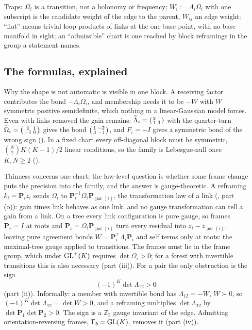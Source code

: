 Traps: \(\Omega_i\) is a transition, not a holonomy or frequency; \(W_i:=\Lambda_i\Omega_i\) with one
subscript is the candidate weight of the edge to the parent, \(W_{ij}\) an edge weight; ``flat'' means
trivial loop products of links at the one base point, with no base manifold in sight; an ``admissible''
chart is one reached by block reframings in the group a statement names.

\subsection{The formulas, explained}

Why the shape is not automatic is visible in one block. A receiving factor contributes the bond
\(-\Lambda_i\Omega_i\), and membership needs it to be \(-W\) with \(W\) symmetric positive
semidefinite, which nothing in a linear-Gaussian model forces. Even with links removed the gain remains:
\(\widetilde\Lambda_i=\begin{psmallmatrix}2&1\\1&3\end{psmallmatrix}\) with the quarter-turn
\(\widetilde\Omega_i=\begin{psmallmatrix}0&1\\-1&0\end{psmallmatrix}\) gives the bond
\(\begin{psmallmatrix}1&-2\\3&-1\end{psmallmatrix}\), and \(F_i=-I\) gives a symmetric bond of the wrong
sign (). In a fixed chart every off-diagonal block must be
symmetric, \(\binom N2K(K-1)/2\) linear conditions, so the family is Lebesgue-null once \(K,N\geq2\)
().

Thinness concerns one chart; the law-level question is whether some frame change puts the precision into
the family, and the answer is gauge-theoretic. A reframing \(k_i=\mathbf P_iz_i\) sends \(\Omega_i\) to
\(\mathbf P_i^{-1}\Omega_i\mathbf P_{\operatorname{par}(i)}\), the transformation law of a link
(, part (o)): gain times link behaves as one link, and no gauge
transformation can tell a gain from a link. On a tree every link configuration is pure gauge, so frames
\(\mathbf P_r=I\) at roots and \(\mathbf P_i=\Omega_i\mathbf P_{\operatorname{par}(i)}\) turn every
residual into \(z_i-z_{\operatorname{par}(i)}\), leaving pure agreement bonds
\(W=\mathbf P_i^\top\Lambda_i\mathbf P_i\) and self terms only at roots: the maximal-tree gauge applied to
transitions. The frames must lie in the frame group, which under \(\mathrm{GL}^+(K)\) requires
\(\det\Omega_i>0\); for a forest with invertible transitions this is also necessary (part (iii)). For a
pair the only obstruction is the sign
\[
(-1)^K\det\Lambda_{12}>0
\]
(part (ii)). Informally: a member with invertible bond has \(\Lambda_{12}=-W\), \(W\succ0\), so
\((-1)^K\det\Lambda_{12}=\det W>0\), and a reframing multiplies \(\det\Lambda_{12}\) by
\(\det\mathbf P_1\det\mathbf P_2>0\). The sign is a \(\mathbb Z_2\) gauge invariant of the edge. Admitting
orientation-reversing frames, \(\Gamma_b=\mathrm{GL}(K)\), removes it (part (iv)).

